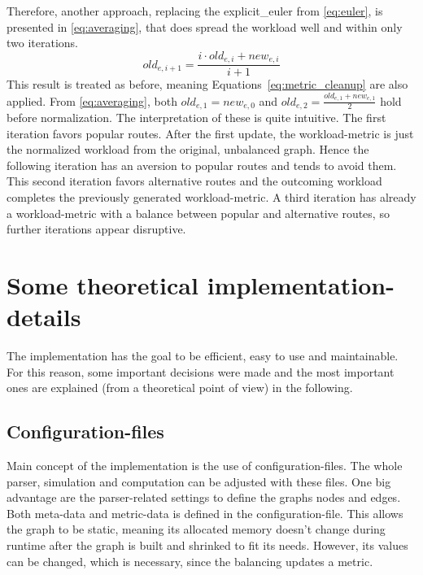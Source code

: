         Therefore, another approach, replacing the \gls{explicit_euler} from \vref{eq:euler}, is presented in \vref{eq:averaging}, that does spread the workload well and within only two iterations.
        \begin{equation}
        \label{eq:averaging}
            \mathit{old}_{e,i+1} = \frac{i \cdot \mathit{old}_{e,i} + \mathit{new}_{e,i}}{i+1}
        \end{equation}
        This result is treated as before, meaning Equations~\ref{eq:metric_cleanup} are also applied.
        From \vref{eq:averaging}, both $\mathit{old}_{e,1}=\mathit{new}_{e,0}$ and $\mathit{old}_{e,2}=\frac{\mathit{old}_{e,1} + \mathit{new}_{e,1}}{2}$ hold before normalization.
        The interpretation of these is quite intuitive.
        The first iteration favors popular routes.
        After the first update, the workload-\gls{metric} is just the normalized workload from the original, unbalanced graph.
        Hence the following iteration has an aversion to popular routes and tends to avoid them.
        This second iteration favors alternative routes and the outcoming workload completes the previously generated workload-\gls{metric}.
        A third iteration has already a workload-\gls{metric} with a balance between popular and alternative routes, so further iterations appear disruptive.

\section{Some theoretical implementation-details}
\label{chap:balancing:implementation}


    The implementation has the goal to be efficient, easy to use and maintainable.
    For this reason, some important decisions were made and the most important ones are explained (from a theoretical point of view) in the following.


    \subsection{Configuration-files}

        Main concept of the implementation is the use of configuration-files.
        The whole parser, simulation and computation can be adjusted with these files.
        One big advantage are the parser-related settings to define the graphs nodes and edges.
        Both meta-data and \gls{metric}-data is defined in the configuration-file.
        This allows the graph to be static, meaning its allocated memory doesn't change during runtime after the graph is built and shrinked to fit its needs.
        However, its values can be changed, which is necessary, since the \gls{balancing} updates a \gls{metric}.

